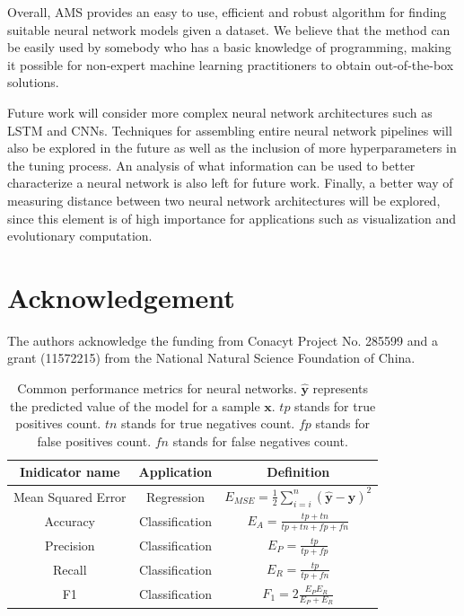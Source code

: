 \documentclass[12pt]{elsart}%
\begin{document}
Overall, AMS provides an easy to use, efficient and robust algorithm for finding suitable neural network models given a dataset. We believe that the method can be easily used by somebody who has a basic knowledge of programming, making it possible for non-expert machine learning practitioners to obtain out-of-the-box solutions.

Future work will consider more complex neural network architectures such as LSTM and CNNs. Techniques for assembling entire neural network pipelines will also be explored in the future as well as the inclusion of more hyperparameters in the tuning process. An analysis of what information can be used to better characterize a neural network is also left for future work. Finally, a better way of measuring distance between two neural network architectures will be explored, since this element is of high importance for applications such as visualization and evolutionary computation.


\section*{Acknowledgement}
The authors acknowledge the funding from Conacyt Project No. 285599 and a grant (11572215) from the National Natural Science Foundation of China.





\clearpage


\begin{table}[!htb]
\begin{center}
\caption{Common performance metrics for neural networks. $\mathbf{\hat{y}}$ represents the predicted value of the model for a sample $\mathbf{x}$. $tp$ stands for true positives count. $tn$ stands for true negatives count. $fp$ stands for false positives count. $fn$ stands for false negatives count.}
\label{table:performance_metrics}
\vspace{12pt}
\begin{tabular}{| c | c | c |}
\hline
Inidicator name & Application & Definition\\
\hline
Mean Squared Error & Regression & $E_{MSE} = \frac{1}{2}\sum_{i=i}^{n} \left( \mathbf{\hat{y}} - \mathbf{y} \right)^2$\\
Accuracy & Classification & $E_{A} = \frac{tp+tn}{tp+tn + fp + fn}$ \\
Precision & Classification & $E_{P} = \frac{tp}{tp+fp}$ \\
Recall & Classification & $E_{R} = \frac{tp}{tp+fn}$\\
F1 & Classification & $F_{1} = 2 \frac{E_{P} E_{R}}{E_{P} + E_{R}}$\\
\hline
\end{tabular}
\end{center}
\end{table}
\end{document}

